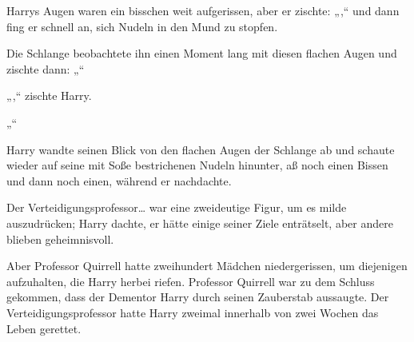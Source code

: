 Harrys Augen waren ein bisschen weit aufgerissen, aber er zischte: „,“ und dann fing er schnell an, sich Nudeln in den Mund zu stopfen.

Die Schlange beobachtete ihn einen Moment lang mit diesen flachen Augen und zischte dann: „“

„,“ zischte Harry.

„“

Harry wandte seinen Blick von den flachen Augen der Schlange ab und schaute wieder auf seine mit Soße bestrichenen Nudeln hinunter, aß noch einen Bissen und dann noch einen, während er nachdachte.

Der Verteidigungsprofessor… war eine zweideutige Figur, um es milde auszudrücken; Harry dachte, er hätte einige seiner Ziele enträtselt, aber andere blieben geheimnisvoll.

Aber Professor Quirrell hatte zweihundert Mädchen niedergerissen, um diejenigen aufzuhalten, die Harry herbei riefen. Professor Quirrell war zu dem Schluss gekommen, dass der Dementor Harry durch seinen Zauberstab aussaugte. Der Verteidigungsprofessor hatte Harry zweimal innerhalb von zwei Wochen das Leben gerettet.

